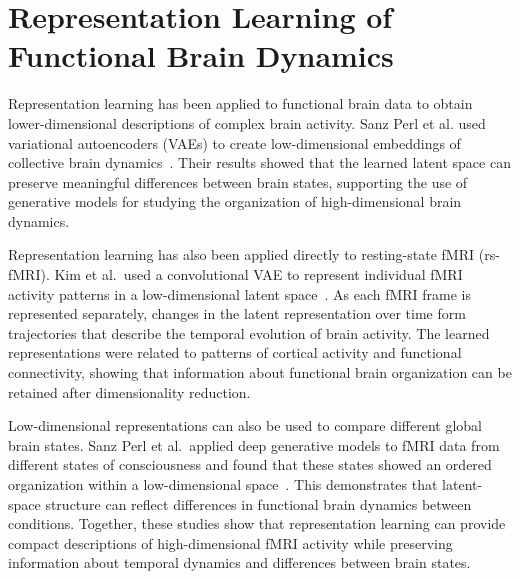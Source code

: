 \section{Representation Learning of Functional Brain Dynamics}

Representation learning has been applied to functional brain data to obtain lower-dimensional descriptions of complex brain activity. 
Sanz Perl et al. used variational autoencoders (VAEs) to create low-dimensional embeddings of collective brain dynamics~\cite{SanzPerl2020}. 
Their results showed that the learned latent space can preserve meaningful differences between brain states, supporting the use of generative models for studying the organization of high-dimensional brain dynamics.

Representation learning has also been applied directly to resting-state fMRI (rs-fMRI). 
Kim et al.\ used a convolutional VAE to represent individual fMRI activity patterns in a low-dimensional latent space~\cite{Kim2021}. 
As each fMRI frame is represented separately, changes in the latent representation over time form trajectories that describe the temporal evolution of brain activity. 
The learned representations were related to patterns of cortical activity and functional connectivity, showing that information about functional brain organization can be retained after dimensionality reduction.

Low-dimensional representations can also be used to compare different global brain states. 
Sanz Perl et al.\ applied deep generative models to fMRI data from different states of consciousness and found that these states showed an ordered organization within a low-dimensional space~\cite{SanzPerl2023}. 
This demonstrates that latent-space structure can reflect differences in functional brain dynamics between conditions. 
Together, these studies show that representation learning can provide compact descriptions of high-dimensional fMRI activity while preserving information about temporal dynamics and differences between brain states.
